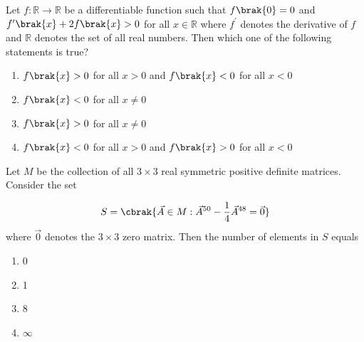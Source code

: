 \item Let $f: \mathbb{R} \to \mathbb{R}$ be a differentiable function such that $f\brak{0} = 0$ and
$f^\prime\brak{x} + 2f\brak{x} > 0$ for all $x \in \mathbb{R}$ where $f^\prime$ denotes the derivative
of $f$ and $\mathbb{R}$ denotes the set of all real numbers. Then which one of the following statements
is true?

\begin{enumerate}
    \item $f\brak{x} > 0$ for all $x > 0$ and $f\brak{x} < 0$ for all $x < 0$
    \item $f\brak{x} < 0$ for all $x \ne 0$
    \item $f\brak{x} > 0$ for all $x \ne 0$
    \item $f\brak{x} < 0$ for all $x > 0$ and $f\brak{x} > 0$ for all $x < 0$
\end{enumerate}

\item Let $M$ be the collection of all $3 \times 3$ real symmetric positive definite matrices.
Consider the set

\begin{align*}
    S = \cbrak{\vec{A} \in M : \vec{A}^{50} - \frac{1}{4}\vec{A}^{48} = \vec{0}}
\end{align*}
where $\vec{0}$ denotes the $3 \times 3$ zero matrix. Then the number of elements in $S$ equals

\begin{multicols}{4}
\begin{enumerate}
    \item 0
    \item 1
    \item 8
    \item $\infty$
\end{enumerate}
\end{multicols}
